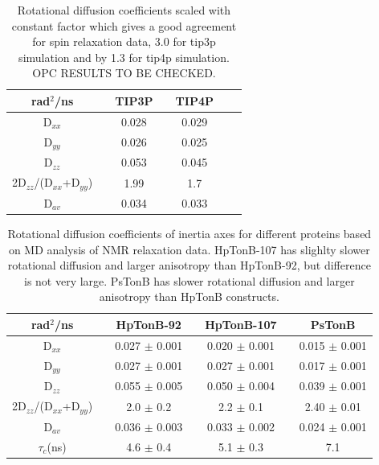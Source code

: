 \documentclass[pre,aps,floatfix,authordate1-4]{revtex4-1}
\begin{document}
\begin{table}[htb]
\centering
\caption{Rotational diffusion coefficients scaled with constant factor which
  gives a good agreement for spin relaxation data,  3.0 for tip3p simulation
    and by 1.3 for tip4p simulation.
  OPC RESULTS TO BE CHECKED.
}\label{ROTdiffCOEFFS}
\begin{tabular}{c c c c c c c }
  rad$^2$/ns   &    &  TIP3P  &   &   TIP4P \\%
  \hline
  D$_{xx}$    &   &   0.028   &   &   0.029 \\%
  D$_{yy}$   &    &  0.026   &    &   0.025 \\%
  D$_{zz}$   &    &  0.053    &    &   0.045 \\%
  2D$_{zz}$/(D$_{xx}$+D$_{yy}$) &  &   1.99    &  & 1.7 \\%
  D$_{av}$  &    &   0.034    &    &   0.033 \\%
\end{tabular}
\end{table} 


\begin{table}[!p]
\centering
\caption{
  Rotational diffusion coefficients of inertia axes for different proteins based on MD analysis of NMR relaxation data.
  HpTonB-107 has slighlty slower rotational diffusion and larger anisotropy than HpTonB-92,
  but difference is not very large. PsTonB has slower rotational diffusion and larger anisotropy than
  HpTonB constructs.
}\label{ROTdiffCOEFFS}
\begin{tabular}{c c c c c c c}
  rad$^2$/ns   &    &  HpTonB-92  &   & HpTonB-107 & & PsTonB \\
  \hline
  D$_{xx}$    &   &   0.027 $\pm$ 0.001  &   &  0.020 $\pm$ 0.001 & & 0.015  $\pm$ 0.001\\
  D$_{yy}$   &    &  0.027  $\pm$ 0.001  &    & 0.027 $\pm$ 0.001 & & 0.017  $\pm$ 0.001\\
  D$_{zz}$   &    &  0.055   $\pm$ 0.005  &    &  0.050  $\pm$ 0.004 & & 0.039  $\pm$ 0.001\\
  2D$_{zz}$/(D$_{xx}$+D$_{yy}$) &  &   2.0  $\pm$ 0.2    &  & 2.2   $\pm$ 0.1 & & 2.40 $\pm$ 0.01 \\
  D$_{av}$  &    &   0.036  $\pm$ 0.003    &    &  0.033  $\pm$ 0.002 & & 0.024  $\pm$ 0.001\\
  $\tau_{c}$(ns)  &    &  4.6   $\pm$ 0.4    &    &  5.1  $\pm$ 0.3 & & 7.1 \\
\end{tabular}
\end{table} 
\end{document}

